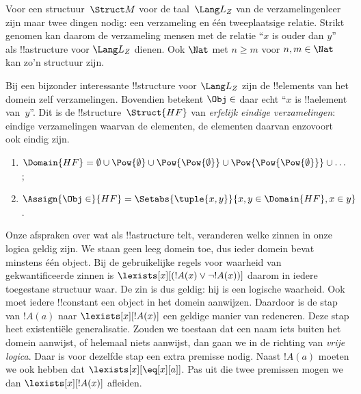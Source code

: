 \documentclass[openany]{memoir}
\begin{document}
\begin{ex}
Voor een structuur~$\Struct M$ voor de taal~$\Lang L_Z$ van de
verzamelingenleer zijn maar twee dingen nodig: een verzameling en één
tweeplaatsige relatie. Strikt genomen kan daarom de verzameling mensen
met de relatie ``$x$ is ouder dan $y$'' als !!a{structure} voor $\Lang
L_Z$ dienen. Ook $\Nat$ met $n \ge m$ voor $n, m \in \Nat$ kan zo'n
structuur zijn.

Bij een bijzonder interessante !!{structure} voor $\Lang L_Z$ zijn de
!!{element}s van het domein zelf verzamelingen. Bovendien betekent
$\Obj \in$ daar echt ``$x$ is !!a{element} van~$y$''. Dit is de
!!{structure}~$\Struct{{HF}}$ van \emph{erfelijk eindige
verzamelingen}: eindige verzamelingen waarvan de elementen, de elementen
daarvan enzovoort ook eindig zijn.
\begin{enumerate}
\item $\Domain{{{HF}}} = \emptyset \cup \Pow{\emptyset} \cup
  \Pow{\Pow{\emptyset}} \cup \Pow{\Pow{\Pow{\emptyset}}} \cup \dots$;
\item $\Assign{\Obj \in}{{{HF}}} = \Setabs{\tuple{x, y}}{x, y \in
  \Domain{{{HF}}}, x \in y}$.
\end{enumerate}
\end{ex}

\begin{digress}
Onze afspraken over wat als !!a{structure} telt, veranderen welke
zinnen in onze logica geldig zijn. We staan geen leeg domein toe, dus
ieder domein bevat minstens één object. Bij de gebruikelijke regels
voor waarheid van gekwantificeerde zinnen is
$\lexists[x][(!A(x) \lor \lnot !A(x))]$ daarom in iedere toegestane
structuur waar. De zin is dus geldig: hij is een logische waarheid.
Ook moet iedere !!{constant} een object in het domein aanwijzen.
Daardoor is de stap van $!A(a)$ naar $\lexists[x][!A(x)]$ een geldige
manier van redeneren. Deze stap heet existentiële generalisatie.
Zouden we toestaan dat een naam iets buiten het domein aanwijst, of
helemaal niets aanwijst, dan gaan we in de richting van
\emph{vrije logica}. Daar is voor dezelfde stap een extra premisse
nodig. Naast $!A(a)$ moeten we ook hebben dat
$\lexists[x][\eq[x][a]]$. Pas uit die twee premissen mogen we dan
$\lexists[x][!A(x)]$ afleiden.
\end{digress}
\endgroup

\begingroup
\def\olfilename{OLP-0162}
\def\olfilepath{content/first-order-logic/syntax-and-semantics/}
\hypertarget{unit-OLP-0162}{}
\end{document}
